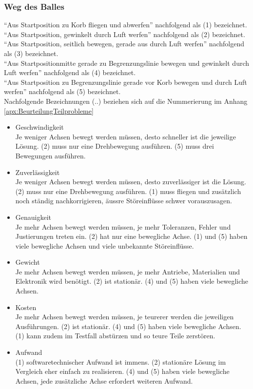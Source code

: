 		\subsubsection{Weg des Balles}
		\enquote{Aus Startposition zu Korb fliegen und abwerfen} nachfolgend als (1) bezeichnet.\\	
		\enquote{Aus Startposition, gewinkelt durch Luft werfen} nachfolgend als (2) bezeichnet.	\\
		\enquote{Aus Startposition, seitlich bewegen, gerade aus durch Luft werfen} nachfolgend als (3) bezeichnet.\\
		\enquote{Aus Startpositionmitte gerade zu Begrenzungslinie bewegen und gewinkelt durch Luft werfen}	nachfolgend als (4) bezeichnet.\\
		\enquote{Aus Startposition zu Begrenzungslinie gerade vor Korb bewegen und durch Luft werfen} nachfolgend als (5) bezeichnet.\\	
		
		Nachfolgende Bezeichnungen (..) beziehen sich auf die Nummerierung im Anhang \ref{apx:BeurteilungTeilprobleme}			
			\begin{itemize}
				\item Geschwindigkeit\\
				Je weniger Achsen bewegt werden müssen, desto schneller ist die jeweilige Lösung. (2) muss nur eine Drehbewegung ausführen. (5) muss drei Bewegungen ausführen.
				\item Zuverlässigkeit\\
				Je weniger Achsen bewegt werden müssen, desto zuverlässiger ist die Lösung. (2) muss nur eine Drehbewegung ausführen. (1) muss fliegen und zusätzlich noch ständig nachkorrigieren, äussre Störeinflüsse schwer vorauszusagen.
				\item Genauigkeit\\
				Je mehr Achsen bewegt werden müssen, je mehr Toleranzen, Fehler und Justierungen treten ein. (2) hat nur eine bewegliche Achse. (1) und (5) haben viele bewegliche Achsen und viele unbekannte Störeinflüsse.
				\item Gewicht\\
				Je mehr Achsen bewegt werden müssen, je mehr Antriebe, Materialien und Elektronik wird benötigt. (2) ist stationär. (4) und (5) haben viele bewegliche Achsen. 
				\item Kosten\\
				Je mehr Achsen bewegt werden müssen, je teurerer werden die jeweiligen Ausführungen. (2) ist stationär. (4) und (5) haben viele bewegliche Achsen. (1) kann zudem im Testfall abstürzen und so teure Teile zerstören.
				\item Aufwand\\
				(1) softwaretechnischer Aufwand ist immens. (2) stationäre Lösung im Vergleich eher einfach zu realisieren. (4) und (5) haben viele bewegliche Achsen, jede zusätzliche Achse erfordert weiteren Aufwand.	
			\end{itemize}

